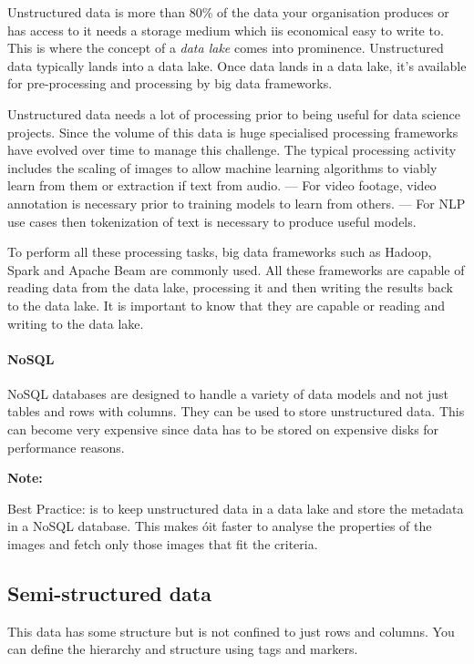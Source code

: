 \documentclass[a4paper, 11pt]{article}
\newenvironment{note}{
    \begin{siderule}
        \textbf{Note: }
        }{
    \end{siderule}}
\begin{document}
    Unstructured data is more than 80\% of the data your organisation produces or has access to it needs a storage medium which iis economical easy to write to.
    This is where the concept of a \textit{data lake} comes into prominence.
    Unstructured data typically lands into a data lake.
    Once data lands in a data lake, it's available for pre-processing and processing by big data frameworks.

    Unstructured data needs a lot of processing prior to being useful for data science projects.
    Since the volume of this data is huge specialised processing frameworks have evolved over time to manage this challenge.
    The typical processing activity includes the scaling of images to allow machine learning algorithms to viably learn from them or extraction if text from audio.
    --- For video footage, video annotation is necessary prior to training models to learn from others.
    --- For NLP use cases then tokenization of text is necessary to produce useful models.

    To perform all these processing tasks, big data frameworks such as Hadoop, Spark and Apache Beam are commonly used.
    All these frameworks are capable of reading data from the data lake, processing it and then writing the results back to the data lake.
    It is important to know that they are capable or reading and writing to the data lake.

    \paragraph{NoSQL}
    NoSQL databases are designed to handle a variety of data models and not just tables and rows with columns.
    They can be used to store unstructured data.
    This can become very expensive since data has to be stored on expensive disks for performance reasons.

    \begin{note}
        Best Practice: is to keep unstructured data in a data lake and store the metadata in a NoSQL database.
        This makes óit faster to analyse the properties of the images and fetch only those images that fit the criteria.
    \end{note}

    \subsection{Semi-structured data}
    This data has some structure but is not confined to just rows and columns.
    You can define the hierarchy and structure using tags and markers.
\end{document}
